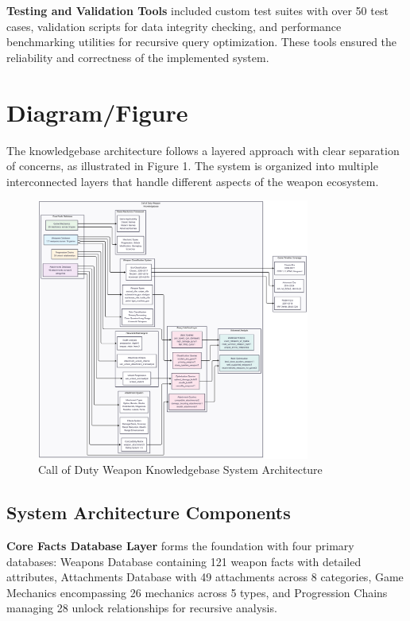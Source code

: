 \documentclass[12pt,a4paper]{article}
\begin{document}
\textbf{Testing and Validation Tools} included custom test suites with over 50 test cases, validation scripts for data integrity checking, and performance benchmarking utilities for recursive query optimization. These tools ensured the reliability and correctness of the implemented system.

\section{Diagram/Figure}

The knowledgebase architecture follows a layered approach with clear separation
of concerns, as illustrated in Figure 1. The system is organized into multiple
interconnected layers that handle different aspects of the weapon ecosystem.


\begin{figure}[H]
    \centering
    \includegraphics[width=0.8\textwidth]{../diagrams/knowledgebase-diagram-vertical.png}
    \caption{Call of Duty Weapon Knowledgebase System Architecture}
\end{figure}

\subsection{System Architecture Components}

\textbf{Core Facts Database Layer} forms the foundation with four primary databases: Weapons Database containing 121 weapon facts with detailed attributes, Attachments Database with 49 attachments across 8 categories, Game Mechanics encompassing 26 mechanics across 5 types, and Progression Chains managing 28 unlock relationships for recursive analysis.
\end{document}
